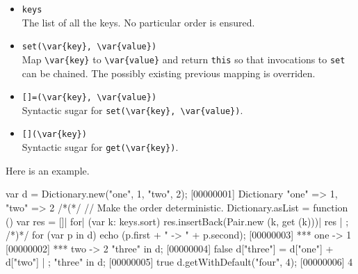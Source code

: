 \begin{itemize}
\item \lstinline|keys|\\
  The list of all the keys.  No particular order is ensured.

\item \lstinline|set(\var{key}, \var{value})|\\
  Map \lstinline|\var{key}| to \lstinline|\var{value}| and return
  \lstinline|this| so that invocations to \lstinline|set| can be
  chained.  The possibly existing previous mapping is overriden.

\item \lstinline|[]=(\var{key}, \var{value})|\\
  Syntactic sugar for \lstinline|set(\var{key}, \var{value})|.

\item \lstinline|[](\var{key})|\\
  Syntactic sugar for \lstinline|get(\var{key})|.
\end{itemize}

Here is an example.

\begin{urbiscript}
var d = Dictionary.new("one", 1, "two", 2);
[00000001] Dictionary {"one" => 1, "two" => 2}
/*(*/
  // Make the order deterministic.
  Dictionary.asList =
  function ()
  {
    var res = []|
    for| (var k: keys.sort)
      res.insertBack(Pair.new (k, get (k)))|
    res
  } | {};
/*)*/
for (var p in d)
  echo (p.first + " -> " + p.second);
[00000003] *** one -> 1
[00000002] *** two -> 2
"three" in d;
[00000004] false
d["three"] = d["one"] + d["two"] | {};
"three" in d;
[00000005] true
d.getWithDefault("four", 4);
[00000006] 4
\end{urbiscript}


